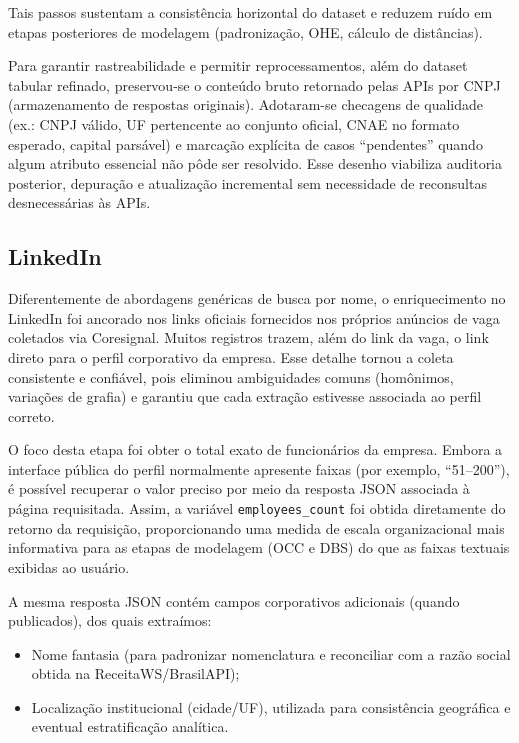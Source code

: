 Tais passos sustentam a consistência horizontal do dataset e reduzem ruído em etapas posteriores de modelagem (padronização, OHE, cálculo de distâncias).

Para garantir rastreabilidade e permitir reprocessamentos, além do dataset tabular refinado, preservou-se o conteúdo bruto retornado pelas APIs por CNPJ (armazenamento de respostas originais). Adotaram-se checagens de qualidade (ex.: CNPJ válido, UF pertencente ao conjunto oficial, CNAE no formato esperado, capital parsável) e marcação explícita de casos “pendentes” quando algum atributo essencial não pôde ser resolvido. Esse desenho viabiliza auditoria posterior, depuração e atualização incremental sem necessidade de reconsultas desnecessárias às APIs.

\subsection{\textbf{LinkedIn}}

Diferentemente de abordagens genéricas de busca por nome, o enriquecimento no LinkedIn foi ancorado nos links oficiais fornecidos nos próprios anúncios de vaga coletados via Coresignal. Muitos registros trazem, além do link da vaga, o link direto para o perfil corporativo da empresa. Esse detalhe tornou a coleta consistente e confiável, pois eliminou ambiguidades comuns (homônimos, variações de grafia) e garantiu que cada extração estivesse associada ao perfil correto.

O foco desta etapa foi obter o total exato de funcionários da empresa. Embora a interface pública do perfil normalmente apresente faixas (por exemplo, ``51--200''), é possível recuperar o valor preciso por meio da resposta JSON associada à página requisitada. Assim, a variável \texttt{employees\_count} foi obtida diretamente do retorno da requisição, proporcionando uma medida de escala organizacional mais informativa para as etapas de modelagem (OCC e DBS) do que as faixas textuais exibidas ao usuário.

A mesma resposta JSON contém campos corporativos adicionais (quando publicados), dos quais extraímos:
\begin{itemize}
    \item Nome fantasia (para padronizar nomenclatura e reconciliar com a razão social obtida na ReceitaWS/BrasilAPI);
    \item Localização institucional (cidade/UF), utilizada para consistência geográfica e eventual estratificação analítica.
\end{itemize}

